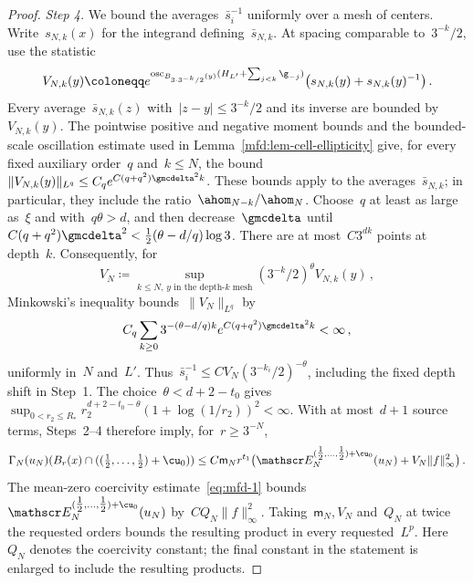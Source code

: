 \documentclass[11pt]{amsart}
\begin{document}
\begin{proof}
\emph{Step 4.} We bound the averages~$\bar s_i^{-1}$ uniformly over a mesh of centers. Write~$s_{N,k}(x)$ for the integrand defining~$\bar s_{N,k}$. At spacing comparable to~$3^{-k}/2$, use the statistic
\begin{equation*}
	V_{N,k}(y)\coloneqq e^{\operatorname{osc}_{B_{3\cdot3^{-k}/2}(y)}
	(H_{L'}+\sum_{j<k}\g_{-j})}
	\bigl(s_{N,k}(y)+s_{N,k}(y)^{-1}\bigr)\,.
\end{equation*}
Every average~$\bar s_{N,k}(z)$ with~$|z-y|\leq3^{-k}/2$ and its inverse are bounded by~$V_{N,k}(y)$. The pointwise positive and negative moment bounds and the bounded-scale oscillation estimate used in Lemma~\ref{mfd:lem-cell-ellipticity} give, for every fixed auxiliary order~$q$ and~$k\leq N$, the bound~$\|V_{N,k}(y)\|_{L^q}\leq C_q e^{C(q+q^2)\gmcdelta^2 k}$. These bounds apply to the averages~$\bar s_{N,k}$; in particular, they include the ratio~$\ahom_{N-k}/\ahom_N$. Choose~$q$ at least as large as~$\xi$ and with~$q\theta>d$, and then decrease~$\gmcdelta$ until~$C(q+q^2)\gmcdelta^2<\tfrac12(\theta-d/q)\log3$. There are at most~$C3^{dk}$ points at depth~$k$. Consequently, for
\begin{equation*}
	V_N\coloneqq\sup_{k\leq N,\,y\text{ in the depth-}k\text{ mesh}}
	(3^{-k}/2)^\theta V_{N,k}(y)\,,
\end{equation*}
Minkowski's inequality bounds~$\|V_N\|_{L^q}$ by
\begin{equation*}
	C_q\sum_{k\geq0}3^{-(\theta-d/q)k}
	e^{C(q+q^2)\gmcdelta^2 k}<\infty\,,
\end{equation*}
uniformly in~$N$ and~$L'$. Thus~$\bar s_i^{-1}\leq CV_N(3^{-k_i}/2)^{-\theta}$, including the fixed depth shift in Step~1. The choice~$\theta<d+2-t_0$ gives~$\sup_{0<r_2\leq R_*}r_2^{d+2-t_0-\theta}(1+\log(1/r_2))^2<\infty$. With at most~$d+1$ source terms, Steps~2--4 therefore imply, for~$r\geq3^{-N}$,
\begin{equation*}
	\Gamma_N(u_N)(B_r(x)\cap((\tfrac12,\dots,\tfrac12)+\cu_0))
	\leq C\mathsf m_N r^{t_1}
	\bigl(\mathscr E_N^{(\tfrac12,\dots,\tfrac12)+\cu_0}(u_N)+V_N\|f\|_\infty^2\bigr)\,.
\end{equation*}
The mean-zero coercivity estimate~\eqref{eq:mfd-1} bounds~$\mathscr E_N^{(\tfrac12,\dots,\tfrac12)+\cu_0}(u_N)$ by~$CQ_N\|f\|_\infty^2$. Taking~$\mathsf m_N,V_N$ and~$Q_N$ at twice the requested orders bounds the resulting product in every requested~$L^p$. Here~$Q_N$ denotes the coercivity constant; the final constant in the statement is enlarged to include the resulting products.


\end{proof}
\end{document}
